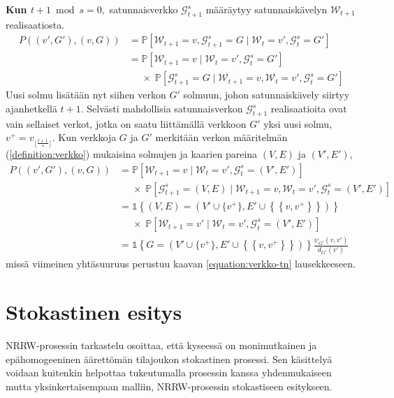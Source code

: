 \documentclass[finnish, 12pt, a4paper, sci, utf8, pdfa]{aaltothesis}
\newcommand{\Grandom}{\mathcal{G}}
\newcommand{\Wrandom}{\mathcal{W}}
\newcommand{\indicator}{\mathopen{\mathds{1}}}
\newcommand*{\prob}{\mathbb{P}}
\begin{document}
\textbf{Kun $ t + 1 \bmod s = 0, $} satunnaisverkko $ \Grandom^{s}_{t+1} $ määräytyy satunnaiskävelyn $ \Wrandom_{t+1} $ realisaatiosta.
\begin{align*}
   P\left( (v', G'), (v, G) \right) &= \prob \left[ \Wrandom_{t+1} = v, \Grandom^{s}_{t+1} = G \mid \Wrandom_{t} = v', \Grandom^{s}_{t} = G' \right] \\
   &= \prob \left[ \Wrandom_{t+1} = v \mid \Wrandom_{t} = v', \Grandom^{s}_{t} = G' \right] \\
   &\mathrel{\phantom{=}} \times \; \prob \left[ \Grandom^{s}_{t+1} = G \mid \Wrandom_{t+1} = v, \Wrandom_{t} = v', \Grandom^{s}_{t} = G' \right]
\end{align*}
Uusi solmu lisätään nyt siihen verkon $ G' $ solmuun, johon satunnaiskävely siirtyy ajanhetkellä $ t + 1 $. Selvästi mahdollisia satunnaisverkon $ \Grandom^{s}_{t+1} $ realisaatioita ovat vain sellaiset verkot, jotka on saatu liittämällä verkkoon $ G' $ yksi uusi solmu, $ v^{+} = v_{\lfloor \frac{t+1}{s} \rfloor} $. Kun verkkoja $ G $ ja $ G' $ merkitään verkon määritelmän (\ref{definition:verkko}) mukaisina solmujen ja kaarien pareina $ (V, E) $ ja $ (V', E') $,
\begin{align*}
   P\left( (v', G'), (v, G) \right) &= \prob \left[ \Wrandom_{t+1} = v \mid \Wrandom_{t} = v', \Grandom^{s}_{t} = (V', E') \right] \\
           &\mathrel{\phantom{=}} \times \; \prob \left[ \Grandom^{s}_{t+1} = (V, E) \mid \Wrandom_{t+1} = v, \Wrandom_{t} = v', \Grandom^{s}_{t} = (V', E') \right] \\
           &= \indicator \left\{ (V, E) = (V' \cup \{ v^{+} \}, E' \cup \left\{ \left\{ v, v^{+} \right\} \right\}) \right\} \\
           &\mathrel{\phantom{=}} \times \; \prob \left[ \Wrandom_{t+1} = v' \mid \Wrandom_{t} = v', \Grandom^{s}_{t} = (V', E') \right] \\
           &= \indicator \left\{ G = (V' \cup \{ v^{+} \}, E' \cup \left\{ \left\{ v, v^{+} \right\} \right\}) \right\} \frac{\psi_{G'}(v, v')}{d_{G'}(v')}
\end{align*}
missä viimeinen yhtäsuuruus perustuu kaavan \ref{equation:verkko-tn} lausekkeeseen.

\section{Stokastinen esitys}

NRRW-prosessin tarkastelu osoittaa, että kyseessä on monimutkainen ja epähomogeeninen äärettömän tilajoukon stokastinen prosessi. Sen käsittelyä voidaan kuitenkin helpottaa tukeutumalla
prosessin kanssa yhdenmukaiseen mutta yksinkertaisempaan malliin, NRRW-prosessin stokastiseen esitykseen.
\end{document}

